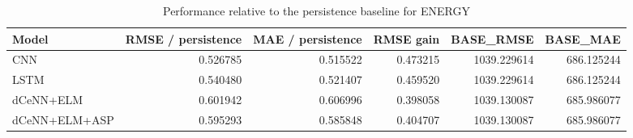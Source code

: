 \begin{table}
\caption{Performance relative to the persistence baseline for ENERGY}
\begin{tabular}{lrrrrr}
\toprule
Model & RMSE / persistence & MAE / persistence & RMSE gain & BASE\_RMSE & BASE\_MAE \\
\midrule
CNN & 0.526785 & 0.515522 & 0.473215 & 1039.229614 & 686.125244 \\
LSTM & 0.540480 & 0.521407 & 0.459520 & 1039.229614 & 686.125244 \\
dCeNN+ELM & 0.601942 & 0.606996 & 0.398058 & 1039.130087 & 685.986077 \\
dCeNN+ELM+ASP & 0.595293 & 0.585848 & 0.404707 & 1039.130087 & 685.986077 \\
\bottomrule
\end{tabular}
\end{table}
